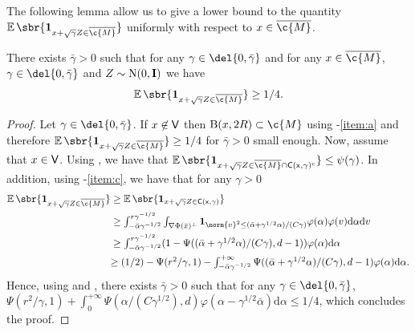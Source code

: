 The following lemma allow us to give a lower bound to the quantity $\E\sbr{\bm{1}_{x+\sqrt{\gamma}Z \in \cl{\c{M}}}}$ uniformly with respect to $x \in \cl{\c{M}}$.

\begin{lemma}
	\label{lemma:lower_bound_prob}
	There exists $\bar{\gamma} >0$ such that for any $\gamma \in \del{0, \bar{\gamma}}$ and for any $x \in \cl{\c{M}}$, $\gamma \in \del{0, \bar{\gamma}}$ and $Z \sim \mathrm{N}(0, \m{I})$ we have \begin{equation} \E\sbr{\bm{1}_{x + \sqrt{\gamma} Z \in \cl{\c{M}}}} \geq 1/4 .
	\end{equation}
\end{lemma}

\begin{proof}
	Let $\gamma \in \del{0, \bar{\gamma}}$.
	If $x \not \in \sf{V}$ then $\mathrm{B}(x,2R) \subset \c{M}$ using -\ref{item:a} and therefore $\E\sbr{\bm{1}_{x + \sqrt{\gamma} Z \in \cl{\c{M}}}} \geq 1/4$ for $\bar{\gamma} > 0$ small enough.
	Now, assume that $x \in \sf{V}$.
	Using , we have that $\E\sbr{\bm{1}_{x + \sqrt{\gamma} Z \in \cl{\c{M}}\cap \sf{C}(x, \gamma)^\mathrm{c}}} \leq \psi(\gamma)$.
	In addition, using -\ref{item:c}, we have that for any $\gamma >0$ \begin{align} \E\sbr{\bm{1}_{x + \sqrt{\gamma} Z \in \cl{\c{M}}}} & \geq \E\sbr{\bm{1}_{x + \sqrt{\gamma} Z \in \sf{C}(x, \gamma)}} \\ &\geq \textstyle{\int_{-\bar{\alpha} \gamma^{-1/2}}^{r \gamma^{-1/2}} \int_{\nabla \Phi(\bar{x})^\perp} \bm{1}_{\norm{v}^2\leq (\bar{\alpha}+\gamma^{1/2}\alpha)/(C\gamma)} \varphi(\alpha)\varphi(v) \mathrm{d} \alpha \mathrm{d} v} \\ &\geq \textstyle{\int_{-\bar{\alpha} \gamma^{-1/2}}^{r \gamma^{-1/2}} (1 - \Psi((\bar{\alpha}+\gamma^{1/2}\alpha)/(C\gamma),d-1)) \varphi(\alpha) \mathrm{d} \alpha} \\  & \textstyle{\geq (1/2) - \Psi(r^2/\gamma, 1) - \int_{-\bar{\alpha} \gamma^{-1/2}}^{+\infty} \Psi((\bar{\alpha}+\gamma^{1/2}\alpha)/(C\gamma),d-1) \varphi(\alpha) \mathrm{d} \alpha.
                 }
	\end{align}
	Hence, using  and , there exists $\bar{\gamma} >0$ such that for any $\gamma \in \del{0, \bar{\gamma}}$, $\Psi(r^2/\gamma, 1) + \int_0^{+\infty} \Psi(\alpha/(C\gamma^{1/2}),d) \varphi(\alpha-\gamma^{1/2}\bar{\alpha}) \mathrm{d} \alpha \leq 1/4$, which concludes the proof.
\end{proof}

